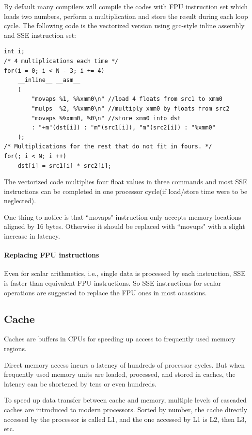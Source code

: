 \documentclass[a4paper]{report}
\begin{document}
	By default many compilers will compile the codes with FPU instruction set which loads two numbers, perform a multiplication and store the result during each loop cycle. The following code is the vectorized version using gcc-style inline assembly and SSE instruction set:
	
        \lstset{language = c, tabsize = 4}
        \begin{lstlisting}
int i;
/* 4 multiplications each time */
for(i = 0; i < N - 3; i += 4)
	__inline__ __asm__
	(
		"movaps %1, %%xmm0\n" //load 4 floats from src1 to xmm0
		"mulps  %2, %%xmm0\n" //multiply xmm0 by floats from src2
		"movaps %%xmm0, %0\n" //store xmm0 into dst
		: "+m"(dst[i]) : "m"(src1[i]), "m"(src2[i]) : "%xmm0"
	);
/* Multiplications for the rest that do not fit in fours. */
for(; i < N; i ++)
	dst[i] = src1[i] * src2[i];
        \end{lstlisting}

	The vectorized code multiplies four float values in three commands and most SSE instructions can be completed in one processor cycle(if load/store time were to be neglected).

	One thing to notice is that ``movaps" instruction only accepts memory locations aligned by 16 bytes. Otherwise it should be replaced with ``movups" with a slight increase in latency.

\paragraph{Replacing FPU instructions} \indent \bigskip

	Even for scalar arithmetics, i.e., single data is processed by each instruction, SSE is faster than equivalent FPU instructions. So SSE instructions for scalar operations are suggested to replace the FPU ones in most ocassions.

\subsection{Cache} \indent

	Caches are buffers in CPUs for speeding up access to frequently used memory regions.
	
	Direct memory access incurs a latency of hundreds of processor cycles. But when frequently used memory units are loaded, processed, and stored in caches, the latency can be shortened by tens or even hundreds.
	
	To speed up data transfer between cache and memory, multiple levels of cascaded caches are introduced to modern processors. Sorted by number, the cache directly accessed by the processor is called L1, and the one accessed by L1 is L2, then L3, etc.
	
\end{document}
